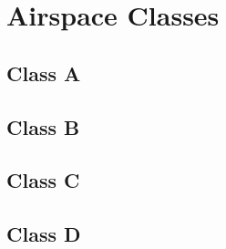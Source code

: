 

\section{Airspace Classes}
\subsection{Class A}
\subsection{Class B}
\subsection{Class C}
\subsection{Class D}

